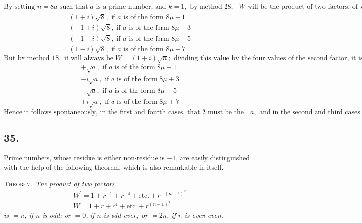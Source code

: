\documentclass[twoside,12pt, showframe]{memoir}
\begin{document}
\[
\text{By setting } n=8a \text{ such that } a \text{ is a prime number, and } k=1, \text{ by method } 28, \text{ } W \text{ will be the product of two factors, of which one will be } +\sqrt{a} \text{ or } +i\sqrt{a} \text{, if 8, or which is the same, 2, is the quadratic residue of } a; \text{ on the contrary } -\sqrt{a} \text{ or } -i\sqrt{a} \text{, if 2 is not a residue of } a. \text{ The second factor is }
\]
\[
\begin{aligned}
& (1+i)\sqrt{8}, \text{ if } a \text{ is of the form } 8\mu+1 \\
& (-1+i)\sqrt{8}, \text{ if } a \text{ is of the form } 8\mu+3 \\
& (-1-i)\sqrt{8}, \text{ if } a \text{ is of the form } 8\mu+5 \\
& (1-i)\sqrt{8}, \text{ if } a \text{ is of the form } 8\mu+7
\end{aligned}
\]
\[
\text{But by method } 18, \text{ it will always be } W=(1+i)\sqrt{n}; \text{ dividing this value by the four values of the second factor, it is evident that the first factor must be}
\]
\[
\begin{aligned}
& +\sqrt{a}, \text{ if } a \text{ is of the form } 8\mu+1 \\
& -i\sqrt{a}, \text{ if } a \text{ is of the form } 8\mu+3 \\
& -\sqrt{a}, \text{ if } a \text{ is of the form } 8\mu+5 \\
& +i\sqrt{a}, \text{ if } a \text{ is of the form } 8\mu+7
\end{aligned}
\]
\[
\text{Hence it follows spontaneously, in the first and fourth cases, that 2 must be the residue of } a, \text{ and in the second and third cases it must not be the residue.}
\]
%

\subsection*{35.}

Prime numbers, whose residue is either non-residue is \(-1\), are easily distinguished with the help of the following theorem, which is also remarkable in itself.

\textsc{Theorem.} \textit{The product of two factors}
\[\begin{aligned}
& W^{\prime}=1+r^{-1}+r^{-4}+\text{etc.}+r^{-(n-1)^{2}} \\
& W=1+r+r^{4}+\text{etc.}+r^{(n-1)^{2}}
\end{aligned}\]
\textit{is \(=n\), if \(n\) is odd; or \(=0\), if \(n\) is odd even; or \(=2 n\), if \(n\) is even even.}
\end{document}
